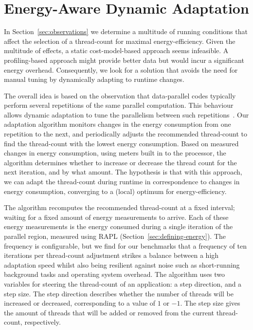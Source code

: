 
\section{Energy-Aware Dynamic Adaptation}\label{sec:implementation}

In Section~\ref{sec:observations} we determine a multitude of running conditions that affect the
selection of a thread-count for maximal energy-efficiency. Given the multitude of effects, a static
cost-model-based approach seems infeasible. A profiling-based approach might provide better data but
would incur a significant energy overhead. Consequently, we look for a solution that avoids the need
for manual tuning by dynamically adapting to runtime changes.

The overall idea is based on the observation that data-parallel codes typically perform several
repetitions of the same parallel computation. This behaviour allows dynamic adaptation to tune the
parallelism between such repetitions~\cite{sac-mtdynamic}. Our adaptation algorithm monitors changes
in the energy consumption from one repetition to the next, and periodically adjusts the recommended
thread-count to find the thread-count with the lowest energy consumption. Based on measured changes
in energy consumption, using meters built in to the processor, the algorithm determines whether to
increase or decrease the thread count for the next iteration, and by what amount. The hypothesis is
that with this approach, we can adapt the thread-count during runtime in correspondence to changes
in energy consumption, converging to a (local) optimum for energy-efficiency.

The algorithm recomputes the recommended thread-count at a fixed interval; waiting for a fixed
amount of energy measurements to arrive. Each of these energy measurements is the energy consumed
during a single iteration of the parallel region, measured using RAPL
(Section~\ref{sec:defining-energy}). The frequency is configurable, but we find for our benchmarks
that a frequency of ten iterations per thread-count adjustment strikes a balance between a high
adaptation speed whilst also being resilient against noise such as short-running background tasks
and operating system overhead. The algorithm uses two variables for steering the thread-count of an
application: a step direction, and a step size. The step direction describes whether the number of
threads will be increased or decreased, corresponding to a value of $1$ or $-1$. The step size gives
the amount of threads that will be added or removed from the current thread-count, respectively.

